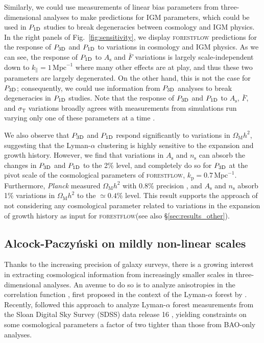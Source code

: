 \documentclass[longauth]{aa}
\newcommand{\lya}{Lyman-$\alpha$\xspace}
\newcommand{\lyaf}{Lyman-$\alpha$ forest\xspace}
\newcommand{\poned}{\ensuremath{P_{\rm 1D}}\xspace}
\newcommand{\pthreed}{\ensuremath{P_{\rm 3D}}\xspace}
\newcommand{\forestflow}{\textsc{forestflow}\xspace}
\newcommand{\iMpc}{\ensuremath{\,\mathrm{Mpc}^{-1}}}
\begin{document}
Similarly, we could use measurements of linear bias parameters from three-dimensional analyses \citep{dumasdesbourboux2020CompletedSDSSIVExtended, desicollaboration2024DESI2024IV} to make predictions for IGM parameters, which could be used in \poned studies to break degeneracies between cosmology and IGM physics. In the right panels of Fig.~\ref{fig:sensitivity}, we display \forestflow predictions for the response of \pthreed and \poned to variations in cosmology and IGM physics. As we can see, the response of \poned to $A_\mathrm{s}$ and $\bar{F}$ variations is largely scale-independent down to $k_\parallel=1\iMpc$ where many other effects are at play, and thus these two parameters are largely degenerated. On the other hand, this is not the case for \pthreed; consequently, we could use information from \pthreed analyses to break degeneracies in \poned studies. Note that the response of \pthreed and \poned to $A_\mathrm{s}$, $\bar{F}$, and $\sigma_\mathrm{T}$ variations broadly agrees with measurements from simulations run varying only one of these parameters at a time \citep{mcdonald2003MeasurementCosmologicalGeometry, mcdonald2005LinearTheoryPower}.

We also observe that \pthreed and \poned respond significantly to variations in $\Omega_\mathrm{M}h^2$, suggesting that the \lya clustering is highly sensitive to the expansion and growth history. However, we find that variations in $A_\mathrm{s}$ and $n_\mathrm{s}$ can absorb the changes in \pthreed and \poned to the 2\% level, and completely do so for \pthreed at the pivot scale of the cosmological parameters of \forestflow, $k_\mathrm{p}=0.7\iMpc$. Furthermore, {\it Planck} measured $\Omega_\mathrm{M}h^2$ with 0.8\% precision \citet{planckcollaboration2020Planck2018Resultsa}, and $A_\mathrm{s}$ and $n_\mathrm{s}$ absorb 1\% variations in $\Omega_\mathrm{M}h^2$ to the $\simeq0.4\%$ level. This result supports the approach of not considering any cosmological parameter related to variations in the expansion of growth history as input for \forestflow (see also \S\ref{sec:results_other}).



\subsection{Alcock-Paczy\'nski on mildly non-linear scales}

Thanks to the increasing precision of galaxy surveys, there is a growing interest in extracting cosmological information from increasingly smaller scales in three-dimensional analyses. An avenue to do so is to analyze anisotropies in the correlation function \citet[AP test;][]{alcock1979EvolutionFreeTesta}, first proposed in the context of the \lyaf by \citet{1999ApJ...518...24M, hui1999GeometricalTestCosmological}. Recently, \cite{cuceu2023ConstraintsCosmicExpansion} followed this approach to analyze \lyaf measurements from the Sloan Digital Sky Survey (SDSS) data release 16 \citep[DR16;][]{Ahumada2020_DR16}, yielding constraints on some cosmological parameters a factor of two tighter than those from BAO-only analyses. 
\end{document}
